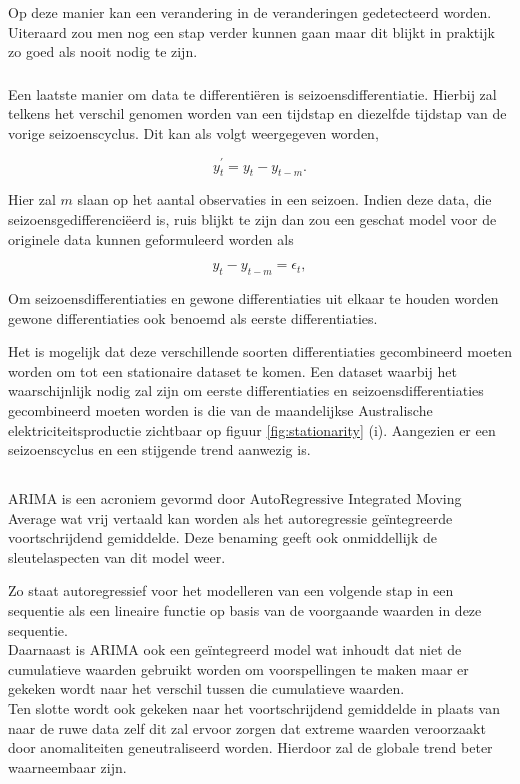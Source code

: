 Op deze manier kan een verandering in de veranderingen gedetecteerd worden. Uiteraard zou men nog een stap verder kunnen gaan maar dit blijkt in praktijk zo goed als nooit nodig te zijn.

\subsubsection{}
Een laatste manier om data te differenti\"{e}ren is seizoensdifferentiatie. Hierbij zal telkens het verschil genomen worden van een tijdstap en diezelfde tijdstap van de vorige seizoenscyclus. Dit kan als volgt weergegeven worden,

\begin{equation}
y_t^\prime = y_t - y_{t-m}.
\end{equation}

Hier zal $m$ slaan op het aantal observaties in een seizoen. Indien deze data, die seizoensgedifferenci\"{e}erd is, ruis blijkt te zijn dan zou een geschat model voor de originele data kunnen geformuleerd worden als

 \begin{equation}
y_t - y_{t-m} = \epsilon_t,
 \end{equation}

Om seizoensdifferentiaties en gewone differentiaties uit elkaar te houden worden gewone differentiaties ook benoemd als eerste differentiaties. 

Het is mogelijk dat deze verschillende soorten differentiaties gecombineerd moeten worden om tot een stationaire dataset te komen. Een dataset waarbij het waarschijnlijk nodig zal zijn om eerste differentiaties en seizoensdifferentiaties gecombineerd moeten worden is die van de maandelijkse Australische elektriciteitsproductie zichtbaar op figuur \ref{fig:stationarity} (i). Aangezien er een seizoenscyclus en een stijgende trend aanwezig is.

\subsection{}

ARIMA is een acroniem gevormd door AutoRegressive Integrated Moving Average wat vrij vertaald kan worden als het autoregressie ge\"{i}ntegreerde voortschrijdend gemiddelde. Deze benaming geeft ook onmiddellijk de sleutelaspecten van dit model weer. 

Zo staat autoregressief voor het modelleren van een volgende stap in een sequentie als een lineaire functie op basis van de voorgaande waarden in deze sequentie.
\\Daarnaast is ARIMA ook een ge\"{i}ntegreerd model wat inhoudt dat niet de cumulatieve waarden gebruikt worden om voorspellingen te maken maar er gekeken wordt naar het verschil tussen die cumulatieve waarden.
\\Ten slotte wordt ook gekeken naar het voortschrijdend gemiddelde in plaats van naar de ruwe data zelf dit zal ervoor zorgen dat extreme waarden veroorzaakt door anomaliteiten geneutraliseerd worden. Hierdoor zal de globale trend beter waarneembaar zijn.


